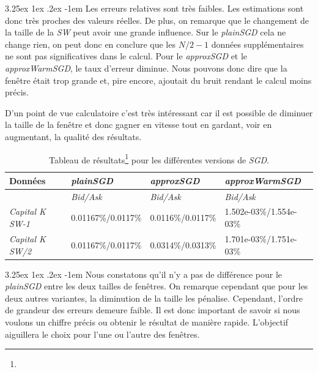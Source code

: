 \documentclass[a4paper, 11pt]{article}
\makeatletter
\renewcommand\paragraph{\@startsection{paragraph}{5}{\z@}%
  {3.25ex \@plus1ex \@minus.2ex}%
  {-1em}%
  {\normalfont\normalsize\bfseries}}
\makeatother
\begin{document}
\paragraph{}
Les erreurs relatives sont très faibles. Les estimations sont donc très proches des valeurs réelles. De plus, on
remarque que le  changement de la taille de la \textit{SW} peut avoir une grande influence. Sur le \textit{plainSGD}
cela ne change rien, on peut donc en conclure que les $N/2 - 1$ données supplémentaires ne sont pas significatives
dans le calcul. Pour le \textit{approxSGD} et le \textit{approxWarmSGD}, le taux d'erreur diminue. Nous pouvons donc
dire que la fenêtre était trop grande et, pire encore, ajoutait du bruit rendant le calcul moins précis.

D'un point de vue calculatoire c'est très intéressant car il est possible de diminuer la taille de la fenêtre et
donc gagner en vitesse tout en gardant, voir en augmentant, la qualité des résultats.


\begin{table}[H]
	\centering
\begin{tabular}{|l|l|l|l|}
	\hline
	Données & \textit{plainSGD} & \textit{approxSGD} & \textit{approxWarmSGD}\\
	\hline
	\ & \textit{Bid/Ask} & \textit{Bid/Ask} & \textit{Bid/Ask} \\
	\hline
	\textit{Capital K SW-1} & 0.01167\%/0.0117\% & 0.0116\%/0.0117\% & 1.502e-03\%/1.554e-03\% \\
	\hline
	\textit{Capital K SW/2} & 0.01167\%/0.0117\% & 0.0314\%/0.0313\% & 1.701e-03\%/1.751e-03\%\\
	\hline

\end{tabular}
\caption[]{Tableau de résultats\footnote{} pour les différentes versions de \textit{SGD}.}
\end{table}


\paragraph{}
Nous constatons qu'il n'y a pas de différence pour le \textit{plainSGD} entre les deux tailles de fenêtres. On
remarque cependant que pour les deux autres variantes, la diminution de la taille les pénalise. Cependant, l'ordre
de grandeur des erreurs demeure faible. Il est donc important de savoir si nous voulons un chiffre précis ou obtenir
le résultat de manière rapide. L'objectif aiguillera le choix pour l'une ou l'autre des fenêtres.
\end{document}
